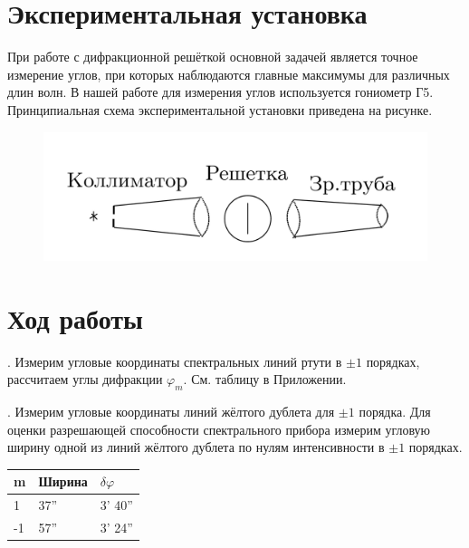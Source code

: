 \documentclass[a4paper,12pt]{article} %
\begin{document}
\section{Экспериментальная установка}

\noindent При работе с дифракционной решёткой основной задачей является точное измерение углов, при которых наблюдаются главные максимумы для различных длин волн. В нашей работе для измерения углов используется гониометр Г5. Принципиальная схема экспериментальной установки приведена на рисунке.

\begin{center}

	\begin{figure}[h!]
		
		\label{inst}
		\includegraphics[scale=0.2]{inst.png}
	\end{figure}
	
\end{center}


\section{Ход работы}

. Измерим угловые координаты спектральных линий ртути в $ \pm1 $ порядках, рассчитаем углы дифракции $\varphi_m$. См. таблицу в Приложении.

\medskip

. Измерим угловые координаты линий жёлтого дублета для $\pm1$ порядка. Для оценки разрешающей способности спектрального прибора измерим угловую ширину одной из линий жёлтого дублета по нулям интенсивности в $\pm1$ порядках.

\begin{table}[h!]
\begin{tabular}{|l|l|l|}
\hline
m  & Ширина & $\delta \varphi$ \\ \hline
1  & 37''   & 3' 40''       \\ \hline
-1 & 57''   & 3' 24''       \\ \hline
\end{tabular}
\end{table}
\end{document}
